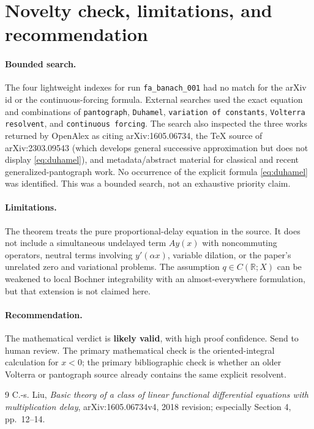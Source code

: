 \documentclass[11pt]{article}
\begin{document}
\section{Novelty check, limitations, and recommendation}

\paragraph{Bounded search.}
The four lightweight indexes for run \texttt{fa\_banach\_001} had no match for
the arXiv id or the continuous-forcing formula.  External searches used the
exact equation and combinations of \texttt{pantograph}, \texttt{Duhamel},
\texttt{variation of constants}, \texttt{Volterra resolvent}, and
\texttt{continuous forcing}.  The search also inspected the three works
returned by OpenAlex as citing arXiv:1605.06734, the TeX source of
arXiv:2303.09543 (which develops general successive approximation but does not
display \eqref{eq:duhamel}), and metadata/abstract material for classical and
recent generalized-pantograph work.  No occurrence of the explicit formula
\eqref{eq:duhamel} was identified.  This was a bounded search, not an
exhaustive priority claim.

\paragraph{Limitations.}
The theorem treats the pure proportional-delay equation in the source.  It
does not include a simultaneous undelayed term $A y(x)$ with noncommuting
operators, neutral terms involving $y'(\alpha x)$, variable dilation, or the
paper's unrelated zero and variational problems.  The assumption
$q\in C(\mathbb R;X)$ can be weakened to local Bochner integrability with an
almost-everywhere formulation, but that extension is not claimed here.

\paragraph{Recommendation.}
The mathematical verdict is \textbf{likely valid}, with high proof confidence.
Send to human review.  The primary mathematical check is the oriented-integral
calculation for $x<0$; the primary bibliographic check is whether an older
Volterra or pantograph source already contains the same explicit resolvent.

\begin{thebibliography}{9}
C.-s. Liu,
\emph{Basic theory of a class of linear functional differential equations
with multiplication delay},
arXiv:1605.06734v4, 2018 revision; especially Section 4, pp.~12--14.
\end{thebibliography}
\end{document}
